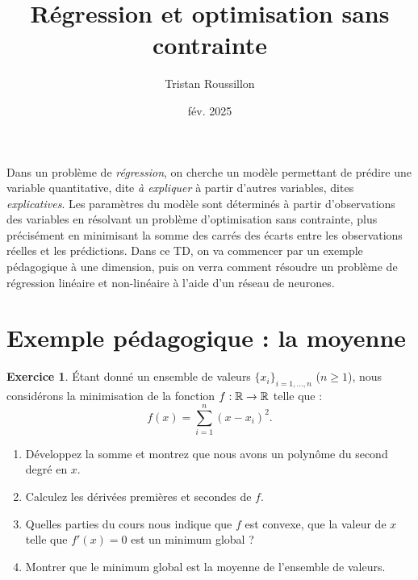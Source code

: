 \documentclass[a4paper,francais]{article}
\title{Régression et optimisation sans contrainte}
\author{Tristan Roussillon}
\date{fév. 2025}
\newcommand{\R}{{\ensuremath\mathbb{R}}}
\theoremstyle{definition}
\newtheorem{exercice}{Exercice}[section]
\begin{document}
\maketitle

Dans un problème de \emph{régression}, on cherche un modèle permettant de prédire une variable quantitative, dite \emph{à expliquer}
à partir d'autres variables, dites \emph{explicatives}. Les paramètres du modèle sont déterminés à partir d'observations
des variables en résolvant un problème d'optimisation sans contrainte, plus précisément en minimisant la somme des carrés
des écarts entre les observations réelles et les prédictions. Dans ce TD, on va commencer par un exemple pédagogique à une dimension,
puis on verra comment résoudre un problème de régression linéaire et non-linéaire à l'aide d'un réseau de neurones.

\section{Exemple pédagogique : la moyenne}
\label{sec:moyenne}

\begin{exercice}
  \'Etant donné un ensemble de valeurs $\{x_i\}_{i = 1,\dots,n}$ ($n \geq 1$),
  nous considérons la minimisation de la fonction $f : \R \rightarrow \R$ telle que :
  \[ f(x) = \sum_{i=1}^n (x-x_i)^2. \] 
  
  \begin{enumerate}
  \item Développez la somme et montrez que nous avons un polynôme du second degré en $x$.
  \item Calculez les dérivées premières et secondes de $f$.
  \item Quelles parties du cours nous indique que $f$ est convexe,
    que la valeur de $x$ telle que $f'(x) = 0$ est un minimum global ?
  \item Montrer que le minimum global est la moyenne de l'ensemble de valeurs.
  \end{enumerate}
\end{exercice}
\end{document}
